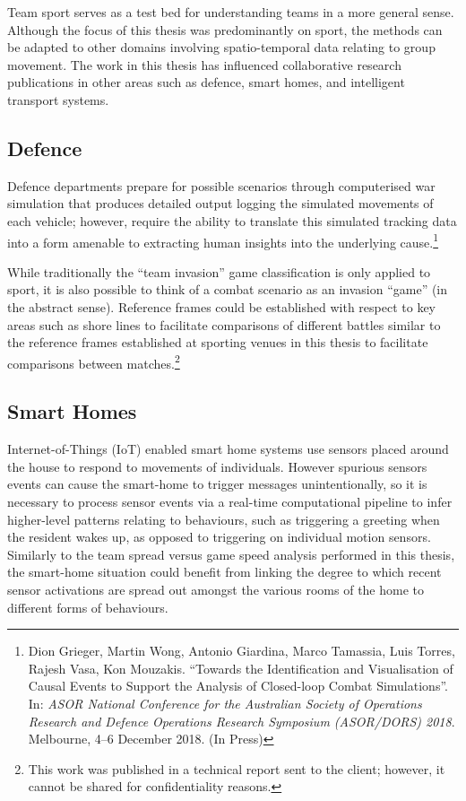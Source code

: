Team sport serves as a test bed for understanding teams in a more general sense. Although the focus of this thesis was predominantly on sport, the methods can be adapted to other domains involving spatio-temporal data relating to group movement. The work in this thesis has influenced collaborative research publications in other areas such as defence, smart homes, and intelligent transport systems.

\subsection{Defence}

Defence departments prepare for possible scenarios through computerised war simulation that produces detailed output logging the simulated movements of each vehicle; however, require the ability to translate this simulated tracking data into a form amenable to extracting human insights into the underlying cause.\footnote{Dion Grieger, Martin Wong, Antonio Giardina, Marco Tamassia, Luis Torres, Rajesh Vasa, Kon Mouzakis. ``Towards the Identification and Visualisation of Causal Events to Support the Analysis of Closed-loop Combat Simulations''. In: \textit{ASOR National Conference for the Australian Society of Operations Research and Defence Operations Research Symposium (ASOR/DORS) 2018}. Melbourne, 4--6 December 2018. (In Press)}

While traditionally the ``team invasion'' game classification is only applied to sport, it is also possible to think of a combat scenario as an invasion ``game'' (in the abstract sense). Reference frames could be established with respect to key areas such as shore lines to facilitate comparisons of different battles similar to the reference frames established at sporting venues in this thesis to facilitate comparisons between matches.\footnote{This work was published in a technical report sent to the client; however, it cannot be shared for confidentiality reasons.}

\subsection{Smart Homes}

Internet-of-Things (IoT) enabled smart home systems use sensors placed around the house to respond to movements of individuals. However spurious sensors events can cause the smart-home to trigger messages unintentionally, so it is necessary to process sensor events via a real-time computational pipeline to infer higher-level patterns relating to behaviours, such as triggering a greeting when the resident wakes up, as opposed to triggering on individual motion sensors. Similarly to the team spread versus game speed analysis performed in this thesis, the smart-home situation could benefit from linking the degree to which recent sensor activations are spread out amongst the various rooms of the home to different forms of behaviours.

